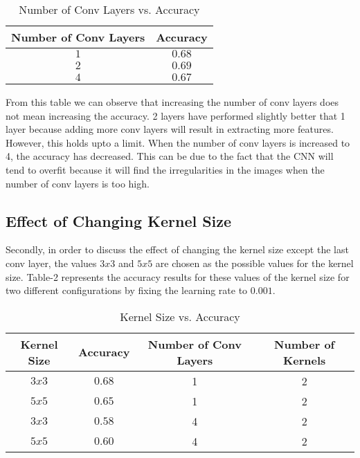 \documentclass[12pt]{article}
\begin{document}
\begin{table}[H]
\begin{center}
\caption{Number of Conv Layers vs. Accuracy}
\begin{tabular}{|c|c|}
\hline
 Number of Conv Layers & Accuracy \\
\hline
$1$ & $0.68$ \\
\hline
$2$ & $0.69$ \\
\hline
$4$ & $0.67$ \\
\hline
\end{tabular}
\end{center}
\end{table}

From this table we can observe that increasing the number of conv layers does not mean increasing the accuracy. 2 layers have performed slightly better that 1 layer because adding more conv layers will result in extracting more features. However, this holds upto a limit. When the number of conv layers is increased to 4, the accuracy has decreased. This can be due to the fact that the CNN will tend to overfit because it will find the irregularities in the images when the number of conv layers is too high.

\subsection{Effect of Changing Kernel Size}

Secondly, in order to discuss the effect of changing the kernel size except the last conv layer, the values $3x3$ and $5x5$ are chosen as the possible values for the kernel size. Table-2 represents the accuracy results for these values of the kernel size for two different configurations by fixing the learning rate to $0.001$.

\begin{table}[H]
\begin{center}
\caption{Kernel Size vs. Accuracy}
\begin{tabular}{|c|c|c|c|}
\hline
 Kernel Size & Accuracy & Number of Conv Layers & Number of Kernels \\
\hline
$3x3$ & $0.68$ & 1 & 2 \\
\hline
$5x5$ & $0.65$ & 1 & 2 \\
\hline
$3x3$ & $0.58$ & 4 & 2 \\
\hline
$5x5$ & $0.60$ & 4 & 2 \\
\hline
\end{tabular}
\end{center}
\end{table}
\end{document}
